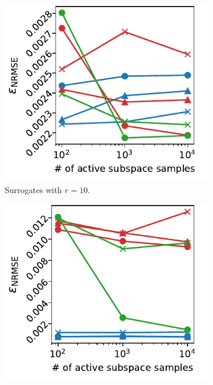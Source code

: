 \documentclass[
  a4paper,  %
  twoside,  %
  bibliography=totoc,
  headsepline,
  cleardoublepage=empty,
  parskip=half,
  draft=false
]{scrbook}
\begin{document}
\begin{mdframed}[style=style]
\begin{figure}[H]
\begin{subfigure}{.5\textwidth}
  \centering
   \includegraphics[width=\linewidth]{graphics/ww_as_10}
	\caption{Surrogates with $r=10$.}
	\label{fig:ww_as_3_inter}
\end{subfigure}
\begin{subfigure}{.5\textwidth}
  \centering
   \includegraphics[width=\linewidth]{graphics/ww_as_7}

\end{subfigure}
\end{figure}
\end{mdframed}
\end{document}
